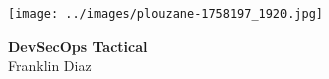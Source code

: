 \begin{titlepage}
    \centering
    \vspace{0mm}
    \texttt{[image: ../images/plouzane-1758197\_1920.jpg]}
    \vspace*{40mm} %
    \begin{flushright}
        \textbf{\Huge {DevSecOps Tactical}}\\
        \vspace{5mm}
        \Large \textsf{Franklin Diaz}\\
        \vspace*{0mm}
    \end{flushright}
    \clearpage
    \vspace*{\fill}
\end{titlepage}